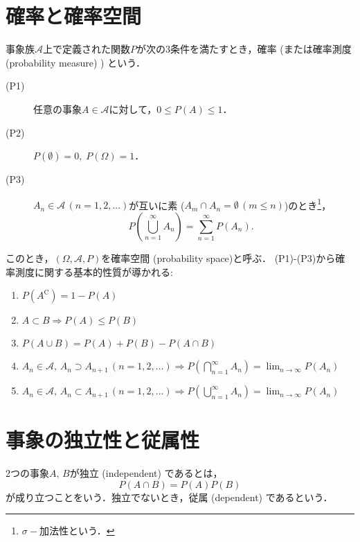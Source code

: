 \documentclass{jsreport}
\begin{document}
\section{確率と確率空間}
\begin{screen}
  \begin{defi}\label{def:pr_measure}
    事象族$\mathscr{A}$上で定義された関数$P$が次の3条件を満たすとき，確率 (または確率測度 (probability measure) ) という．
    \begin{description}
      \item[(P1)] 任意の事象$A \in \mathscr{A}$に対して，$0 \leq P(A) \leq 1$．
      \item[(P2)] $P(\emptyset) = 0, \; P(\Omega) = 1$．
      \item[(P3)] $A_n \in \mathscr{A} \, (n = 1, 2, \ldots)$が互いに素 ($A_m \cap A_n = \emptyset \, (m \leq n)$)のとき\footnote{$\sigma-加法性$という．}，
      \begin{equation}
        P(\bigcup_{n = 1}^{\infty} A_n) = \sum_{n = 1}^{\infty} P(A_n). \; \; \nonumber
      \end{equation}
    \end{description}
  \end{defi}
\end{screen}
このとき，$(\Omega, \mathscr{A}, P)$を確率空間 (probability space)と呼ぶ．
(P1)-(P3)から確率測度に関する基本的性質が導かれる:
\begin{enumerate}
  \item $P(A^{\mathrm{C}}) = 1 - P(A)$
  \item $A \subset B \Longrightarrow P(A) \leq P(B)$
  \item $P(A \cup B) = P(A) + P(B) - P(A \cap B)$
  \item $A_n \in \mathscr{A}, \, A_n \supset A_{n + 1} \, (n = 1, 2, \ldots) \Longrightarrow P(\bigcap_{n = 1}^{\infty} A_n) = \lim_{n \to \infty} P(A_n)$
  \item $A_n \in \mathscr{A}, \, A_n \subset A_{n + 1} \, (n = 1, 2, \ldots) \Longrightarrow P(\bigcup_{n = 1}^{\infty} A_n) = \lim_{n \to \infty} P(A_n)$
\end{enumerate}

\section{事象の独立性と従属性}
\begin{screen}
  \begin{defi}[独立性]
    2つの事象$A, \, B$が独立 (independent) であるとは，
    \begin{equation}
      P(A \cap B) = P(A) P(B) \nonumber
    \end{equation}
    が成り立つことをいう．独立でないとき，従属 (dependent) であるという．
  \end{defi}
\end{screen}
\end{document}
